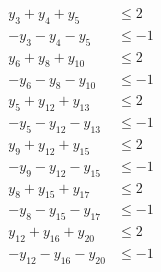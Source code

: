 \documentclass[12pt]{article}
\newenvironment{exercise}[2][Exercise]{\begin{trivlist}
		\item[\hskip \labelsep {\bfseries #1}\hskip \labelsep {\bfseries #2.}]}{\end{trivlist}}
\begin{document}
\begin{exercise}{4}
\begin{align*}
		y_3 + y_4 + y_5 & \leq2\\
		-y_3 - y_4 - y_5 & \leq{-1}\\
		y_6 + y_8 + y_{10}& \leq2\\
		-y_6 - y_8 - y_{10}& \leq {-1}\\
		y_5 + y_{12} + y_{13}& \leq 2\\
		-y_5 - y_{12} - y_{13}& \leq{-1}\\
		y_9 + y_{12} + y_{15}& \leq 2\\
		-y_9 - y_{12} - y_{15}& \leq{-1}\\
		y_8 + y_{15} + y_{17}& \leq 2\\
		-y_8 - y_{15} - y_{17}& \leq{-1}\\
		y_{12} + y_{16} + y_{20}& \leq 2\\
		-y_{12} - y_{16} - y_{20}& \leq{-1}
	\end{align*}
	\end{exercise}
	
\end{document}
